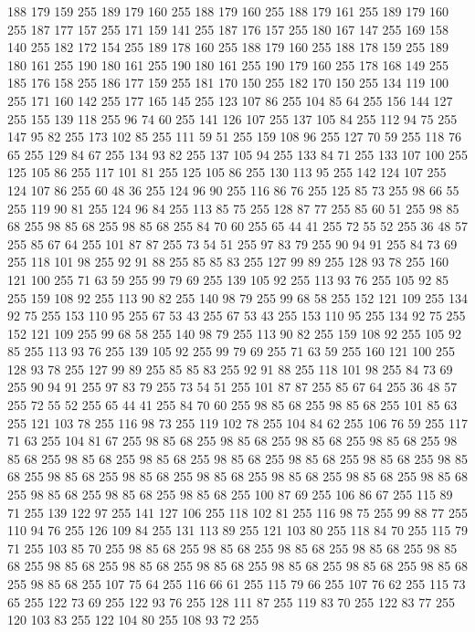 188 179 159 255 189 179 160 255 188 179 160 255 188 179 161 255 189 179 160 255 187 177 157 255 171 159 141 255 187 176 157 255 180 167 147 255 169 158 140 255 182 172 154 255 189 178 160 255 188 179 160 255 188 178 159 255 189 180 161 255 190 180 161 255 190 180 161 255 190 179 160 255 178 168 149 255 185 176 158 255 186 177 159 255 181 170 150 255 182 170 150 255 134 119 100 255 171 160 142 255 177 165 145 255 123 107 86 255 104 85 64 255 156 144 127 255 155 139 118 255 96 74 60 255 141 126 107 255 137 105 84 255 112 94 75 255 147 95 82 255 173 102 85 255 111 59 51 255 159 108 96 255 127 70 59 255 118 76 65 255 129 84 67 255 134 93 82 255 137 105 94 255 133 84 71 255 133 107 100 255 125 105 86 255 117 101 81 255 125 105 86 255 130 113 95 255 142 124 107 255 124 107 86 255 60 48 36 255 124 96 90 255 116 86 76 255 125 85 73 255 98 66 55 255 119 90 81 255 124 96 84 255 113 85 75 255 128 87 77 255 85 60 51 255 98 85 68 255 98 85 68 255 98 85 68 255
84 70 60 255 65 44 41 255 72 55 52 255 36 48 57 255 85 67 64 255 101 87 87 255 73 54 51 255 97 83 79 255 90 94 91 255 84 73 69 255 118 101 98 255 92 91 88 255 85 85 83 255 127 99 89 255 128 93 78 255 160 121 100 255 71 63 59 255 99 79 69 255 139 105 92 255 113 93 76 255 105 92 85 255 159 108 92 255 113 90 82 255 140 98 79 255 99 68 58 255 152 121 109 255 134 92 75 255 153 110 95 255 67 53 43 255 67 53 43 255 153 110 95 255 134 92 75 255 152 121 109 255 99 68 58 255 140 98 79 255 113 90 82 255 159 108 92 255 105 92 85 255 113 93 76 255 139 105 92 255 99 79 69 255 71 63 59 255 160 121 100 255 128 93 78 255 127 99 89 255 85 85 83 255 92 91 88 255 118 101 98 255 84 73 69 255 90 94 91 255 97 83 79 255 73 54 51 255 101 87 87 255 85 67 64 255 36 48 57 255 72 55 52 255 65 44 41 255 84 70 60 255 98 85 68 255 98 85 68 255 101 85 63 255 121 103 78 255 116 98 73 255 119 102 78 255
104 84 62 255 106 76 59 255 117 71 63 255 104 81 67 255 98 85 68 255 98 85 68 255 98 85 68 255 98 85 68 255 98 85 68 255 98 85 68 255 98 85 68 255 98 85 68 255 98 85 68 255 98 85 68 255 98 85 68 255 98 85 68 255 98 85 68 255 98 85 68 255 98 85 68 255 98 85 68 255 98 85 68 255 98 85 68 255 98 85 68 255 98 85 68 255 100 87 69 255 106 86 67 255 115 89 71 255 139 122 97 255 141 127 106 255 118 102 81 255 116 98 75 255 99 88 77 255 110 94 76 255 126 109 84 255 131 113 89 255 121 103 80 255 118 84 70 255 115 79 71 255 103 85 70 255 98 85 68 255 98 85 68 255 98 85 68 255 98 85 68 255 98 85 68 255 98 85 68 255 98 85 68 255 98 85 68 255 98 85 68 255 98 85 68 255 98 85 68 255 98 85 68 255 107 75 64 255 116 66 61 255 115 79 66 255 107 76 62 255 115 73 65 255 122 73 69 255 122 93 76 255 128 111 87 255 119 83 70 255 122 83 77 255 120 103 83 255 122 104 80 255 108 93 72 255

